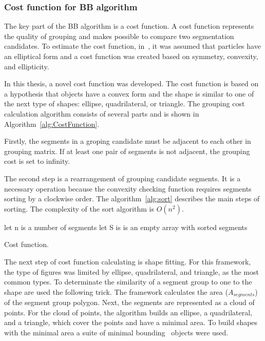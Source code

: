 \documentclass{lutmscthesis}[2010/09/22]
\begin{document}
\subsubsection{Cost function for BB algorithm}

The key part of the BB algorithm is a cost function. A cost function represents the quality of grouping and makes possible to compare two segmentation candidates. To estimate the cost function, in~\cite{zafari-bb}, it was assumed that particles have an elliptical form and a cost function was created based on symmetry, convexity, and ellipticity.

In this thesis, a novel cost function was developed. The cost function is based on a hypothesis that objects have a convex form and the shape is similar to one of the next type of shapes: ellipse, quadrilateral, or triangle. The grouping cost calculation algorithm consists of several parts and is shown in Algorithm~\ref{alg:CostFunction}.

Firstly, the segments in a groping candidate must be adjacent to each other in grouping matrix. If at least one pair of segments is not adjacent, the grouping cost is set to infinity.

The second step is a rearrangement of grouping candidate segments. It is a necessary operation because the convexity checking function requires segments sorting by a clockwise order. The algorithm~\ref{alg:sort} describes the main steps of sorting. The complexity of the sort algorithm is $O(n^2)$.


\begin{algorithm} [H]
    \SetAlgoLined
    let n is a number of segments\;
    let S is is an empty array with sorted segments\;
\caption{Cost function.}\label{alg:sort}
\end{algorithm}

The next step of cost function calculating is shape fitting. For this framework, the type of figures was limited by ellipse, quadrilateral, and triangle, as the most common types. To determinate the similarity of a segment group to one to the shape are used the following trick. The framework calculates the area ($A_{segments}$) of the segment group polygon. Next, the segments are represented as a cloud of points. For the cloud of points, the algorithm builds an ellipse, a quadrilateral, and a triangle, which cover the points and have a minimal area. To build shapes with the minimal area a suite of minimal bounding~\cite{suite} objects were used. 
\end{document}
